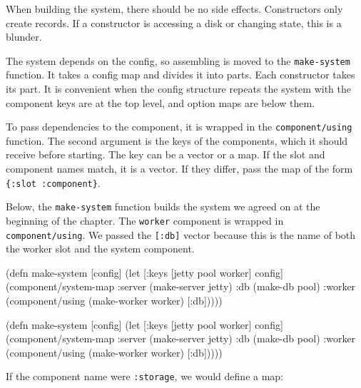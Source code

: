 
When building the system, there should be no side effects. Constructors only create records. If a constructor is accessing a disk or changing state, this is a blunder.

The system depends on the config, so assembling is moved to the \verb|make-system| function. It takes a config map and divides it into parts. Each constructor takes its part. It is convenient when the config structure repeats the system with the component keys are at the top level, and option maps are below them.

To pass dependencies to the component, it is wrapped in the \verb|component/using| function. The second argument is the keys of the components, which it should receive before starting. The key can be a vector or a map. If the slot and component names match, it is a vector. If they differ, pass the map of the form \verb|{:slot :component}|.

Below, the \verb|make-system| function builds the system we agreed on at the beginning of the chapter. The \verb|worker| component is wrapped in \verb|component/using|. We passed the \verb|[:db]| vector because this is the name of both the worker slot and the system component.

\ifnarrow

\begin{english}
  \begin{clojure}
(defn make-system
  [config]
  (let [{:keys [jetty pool worker]}
        config]
    (component/system-map
     :server (make-server jetty)
     :db     (make-db pool)
     :worker (component/using
               (make-worker worker)
               [:db]))))
  \end{clojure}
\end{english}

\else

\begin{english}
  \begin{clojure}
(defn make-system
  [config]
  (let [{:keys [jetty pool worker]} config]
    (component/system-map
     :server (make-server jetty)
     :db     (make-db pool)
     :worker (component/using
              (make-worker worker) [:db]))))
  \end{clojure}
\end{english}

\fi


\noindent
If the component name were \verb|:storage|, we would define a map:

